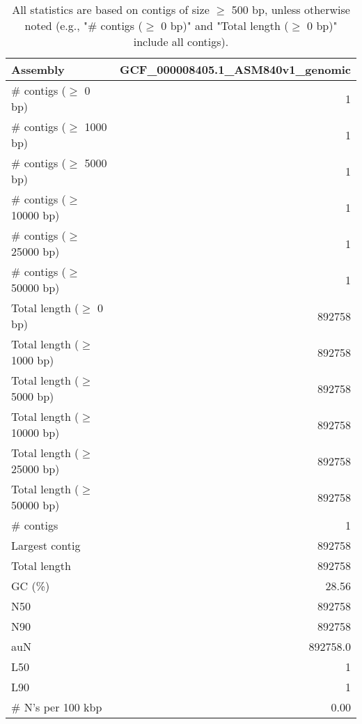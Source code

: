 \documentclass[12pt,a4paper]{article}
\begin{document}
\begin{table}[ht]
\begin{center}
\caption{All statistics are based on contigs of size $\geq$ 500 bp, unless otherwise noted (e.g., "\# contigs ($\geq$ 0 bp)" and "Total length ($\geq$ 0 bp)" include all contigs).}
\begin{tabular}{|l*{1}{|r}|}
\hline
Assembly & GCF\_000008405.1\_ASM840v1\_genomic \\ \hline
\# contigs ($\geq$ 0 bp) & 1 \\ \hline
\# contigs ($\geq$ 1000 bp) & 1 \\ \hline
\# contigs ($\geq$ 5000 bp) & 1 \\ \hline
\# contigs ($\geq$ 10000 bp) & 1 \\ \hline
\# contigs ($\geq$ 25000 bp) & 1 \\ \hline
\# contigs ($\geq$ 50000 bp) & 1 \\ \hline
Total length ($\geq$ 0 bp) & 892758 \\ \hline
Total length ($\geq$ 1000 bp) & 892758 \\ \hline
Total length ($\geq$ 5000 bp) & 892758 \\ \hline
Total length ($\geq$ 10000 bp) & 892758 \\ \hline
Total length ($\geq$ 25000 bp) & 892758 \\ \hline
Total length ($\geq$ 50000 bp) & 892758 \\ \hline
\# contigs & 1 \\ \hline
Largest contig & 892758 \\ \hline
Total length & 892758 \\ \hline
GC (\%) & 28.56 \\ \hline
N50 & 892758 \\ \hline
N90 & 892758 \\ \hline
auN & 892758.0 \\ \hline
L50 & 1 \\ \hline
L90 & 1 \\ \hline
\# N's per 100 kbp & 0.00 \\ \hline
\end{tabular}
\end{center}
\end{table}
\end{document}
